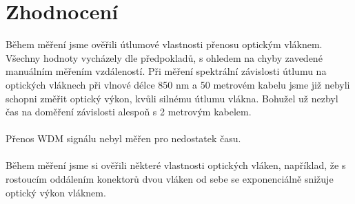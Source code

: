\newpage
\section{Zhodnocení}
Během měření jsme ověřili útlumové vlastnosti přenosu optickým vláknem. Všechny hodnoty vycházely dle předpokladů, s ohledem na chyby zavedené manuálním měřením vzdáleností. Při měření spektrální závislosti útlumu na optických vláknech při vlnové délce 850 nm a 50 metrovém kabelu jsme již nebyli schopni změřit optický výkon, kvůli silnému útlumu vlákna. Bohužel už nezbyl čas na doměření závislosti alespoň s 2 metrovým kabelem.
\\\\
Přenos WDM signálu nebyl měřen pro nedostatek času.
\\\\
Během měření jsme si ověřili některé vlastnosti optických vláken, například, že s rostoucím oddálením konektorů dvou vláken od sebe se exponenciálně snižuje optický výkon vláknem.
